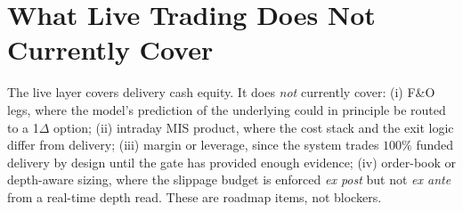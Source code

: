 \section{What Live Trading Does Not Currently Cover}

The live layer covers delivery cash equity. It does \emph{not} currently cover: (i) F\&O legs, where the model's prediction of the underlying could in principle be routed to a 1$\Delta$ option; (ii) intraday MIS product, where the cost stack and the exit logic differ from delivery; (iii) margin or leverage, since the system trades $100\%$ funded delivery by design until the gate has provided enough evidence; (iv) order-book or depth-aware sizing, where the slippage budget is enforced \emph{ex post} but not \emph{ex ante} from a real-time depth read. These are roadmap items, not blockers.
